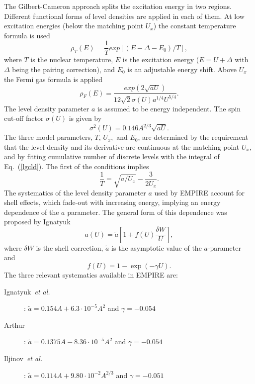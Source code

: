 The Gilbert-Cameron approach \cite{gc} splits the excitation energy in two
regions. Different functional forms of level densities%
 are applied in each of them. At low excitation
energies (below the matching point $U_{x}$) the constant temperature formula
is used
\begin{equation}
\rho_{T}(E)=%
\frac{1}{T}exp\left[(E-\Delta-E_{0})/T\right],  \label{lgcld}
\end{equation}
\noindent where $T$ is the nuclear temperature, $E$ is the excitation energy
($E=U+\Delta$ with $\Delta$ being the pairing correction), and $E_{0}$ is an
adjustable energy shift. Above $U_{x}$ the Fermi gas formula is applied
\begin{equation}
\rho_{F}(E)=\frac{exp(2\sqrt{aU})}{12\sqrt{2}\sigma(U)a^{1/4}U^{5/4}}.
\label{ferld}
\end{equation}
The level density parameter $a$ is assumed to be energy independent. The
spin cut-off factor $\sigma(U)$ is given by
\begin{equation}
\sigma^{2}(U)=0.146A^{2/3}\sqrt{aU}.  \label{sigld}
\end{equation}
The three model parameters, $T,\, U_{x},$ and $E_{0}$, are determined by the
requirement that the level density and its derivative are continuous at the
matching point $U_{x}$, and by fitting cumulative number of discrete levels
with the integral of Eq.~(\ref{lgcld}). The first of the conditions implies
\begin{equation}
\frac{1}{T}=\sqrt{a/U_{x}}-\frac{3}{2U_{x}}.  \label{condUT}
\end{equation}
The systematics of the level density parameter $a$ used by EMPIRE account
for shell effects, which fade-out with increasing energy, implying an energy
dependence of the $a$ parameter. The general form of this dependence was
proposed by Ignatyuk~\cite{ignaa}
\begin{equation}
a(U)=\widetilde{a}[1+f(U)\frac{\delta W}{U}],  \label{apiccoloGC}
\end{equation}
\noindent where $\delta W$ is the shell correction, $\widetilde{a}$ is the
asymptotic value of the $a$-parameter and
\begin{equation}
f(U)=1-\exp(-\gamma U).  \label{shellGC}
\end{equation}
The three relevant systematics available in EMPIRE are:

\begin{description}
\item[Ignatyuk~\emph{et al.}~\protect\cite{ignaa}] : $\widetilde{a}%
=0.154A+6.3\cdot10^{-5}A^{2}$ and $\gamma=-0.054$

\item[Arthur~\protect\cite{arthura}] : $\widetilde{a}=0.1375A-8.36%
\cdot10^{-5}A^{2}$ and $\gamma=-0.054$

\item[Iljinov~\emph{et al.}~\protect\cite{Mebel}] : $\widetilde{a}%
=0.114A+9.80\cdot10^{-2}A^{2/3}$ and $\gamma=-0.051$
\end{description}

